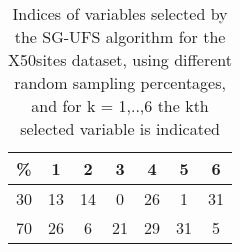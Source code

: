 \begin{table}
	\begin{center}
		\begin{tabular}{c c c c c c c}
			\% & 1 & 2 & 3 & 4 & 5 & 6 \\
			\hline
			30 & 13 & 14 & 0 & 26 & 1 & 31 \\
			70 & 26 & 6 & 21 & 29 & 31 & 5 \\
		\end{tabular}
	\end{center}
	\caption{Indices of variables selected by the SG-UFS algorithm for the X50sites dataset, using different random sampling percentages, and for k = 1,..,6 the kth selected variable is indicated}
\end{table}